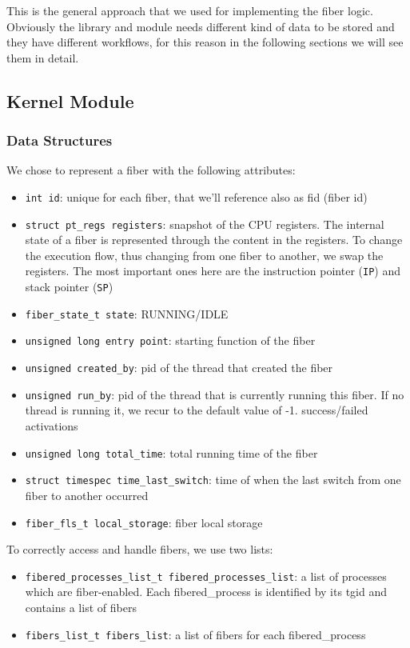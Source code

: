 \documentclass[a4paper,10pt]{article}
\begin{document}
This is the general approach that we used for implementing the fiber logic. Obviously the library and module needs different kind of data to be stored and they have different workflows, for this reason in the following sections we will see them in detail.

\subsection{Kernel Module}
\subsubsection{Data Structures}\label{subsubsec:kern-datas}
We chose to represent a fiber with the following attributes:
\begin{itemize}
	\item \lstinline{int id}: unique for each fiber, that we’ll reference also as fid (fiber id)
	\item \lstinline{struct pt_regs registers}: snapshot of the CPU registers. The internal state of a fiber is represented through the content in the registers. To change the execution flow, thus changing from one fiber to another, we swap the registers. The most important ones here are the instruction pointer (\texttt{IP}) and stack pointer (\texttt{SP})
	\item \lstinline{fiber_state_t state}: RUNNING/IDLE
	\item \lstinline{unsigned long entry point}: starting function of the fiber
	\item \lstinline{unsigned created_by}: pid of the thread that created the fiber
	\item \lstinline{unsigned run_by}: pid of the thread that is currently running this fiber. If no thread is running it, we recur to the default value of -1.
	      success/failed activations
	\item \lstinline{unsigned long total_time}: total running time of the fiber
	\item \lstinline{struct timespec time_last_switch}: time of when the last switch from one fiber to another occurred
	\item \lstinline{fiber_fls_t local_storage}: fiber local storage
\end{itemize}

To correctly access and handle fibers, we use two lists:
\begin{itemize}
	\item \lstinline{fibered_processes_list_t fibered_processes_list}: a list of processes which are fiber-enabled. Each fibered\_process is identified by its tgid and contains a list of fibers
	\item \lstinline{fibers_list_t fibers_list}: a list of fibers for each fibered\_process
\end{itemize}
\end{document}
